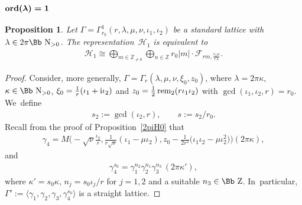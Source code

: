 \documentclass[10pt,a4paper]{amsart}
\newcommand\NN{{\mbox{\Bb N}}}
\newcommand\ZZ{{\mbox{\Bb Z}}}
\newcommand\Z{{\mathbb Z}}
\newcommand\cH{{\mathcal H}}
\newcommand{\rem}{\mathop{{\rm rem}}}
\newcommand{\ord}{{\rm ord}}
\newcommand\la{\langle}
\newcommand\ra{\rangle}
\numberwithin{equation}{section}
\newtheorem{Proposition}[Theorem]{Proposition}
 { \theoremstyle{definition}
\newtheorem{Definition}[Theorem]{Definition}
\newtheorem{Note}[Theorem]{Note}
\newtheorem{Example}[Theorem]{Example}
\newtheorem{Remark}[Theorem]{Remark} }
\begin{document}
\subsubsection[$\ord(\lambda)=1$]{$\boldsymbol{\ord(\lambda)=1}$}

\begin{Proposition}\label{pr:2piH1} Let $\Gamma=\Gamma_{r_0}^1(r,\lambda,\mu,\nu,\iota_1,\iota_2)$ be a standard lattice with $\lambda\in2\pi\NN_{>0}$. The representation~$\cH_1$ is equivalent to
\begin{gather*}
\cH_1\cong\bigoplus_{m\in\Z _{\not=0}}\bigoplus_{n\in \Z} r_0|m|\cdot {\mathcal F}_{rm,\frac{r_0n}{r\lambda}}.
\end{gather*}
\end{Proposition}
\begin{proof}
Consider, more generally, $\Gamma=\Gamma_r(\lambda,\mu,\nu,\xi_0,z_0)$, where $\lambda=2\pi\kappa$, $\kappa\in\NN_{>0}$, $\xi_0=\frac 1r(\iota_1+{\rm i}\iota_2)$ and $z_0=\frac12\rem_2(r\iota_1\iota_2)$ with $\gcd(\iota_1,\iota_2,r)=r_0$. We~define
\begin{gather*}
s_2:=\gcd(\iota_2,r),\qquad s:=s_2/r_0.
\end{gather*}
Recall from the proof of Proposition~\ref{2piH0} that
\begin{gather*}
\gamma_4=M\bigg({-}\sqrt\nu\frac{\iota_2}{r},\frac{1}{r\sqrt\nu}(\iota_1-\mu\iota_2), z_0-\frac{1}{2r^2}\big(\iota_1\iota_2-\mu\iota_2^2\big)\bigg)(2\pi\kappa),
\end{gather*}
and
\begin{gather*}
\gamma_4^{s_0}=\gamma_1^{n_2}\gamma_2^{n_1}\gamma_3^{n_3}\,(2\pi\kappa'),
\end{gather*}
where $\kappa'=s_0\kappa$, $n_j=s_0\iota_j/r$ for $j=1,2$ and a suitable $n_3\in\ZZ$. In~particular, $\Gamma':=\la \gamma_1, \gamma_2, \gamma_3,\gamma_4^{s_0}\ra$ is a straight lattice.


\end{proof}
\end{document}
